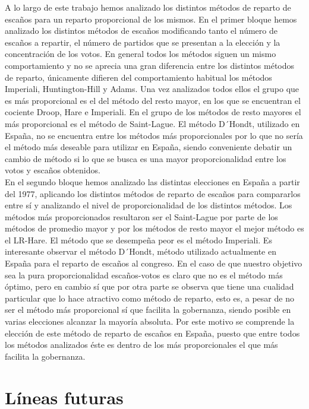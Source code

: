 \documentclass[12pt,a4paper,]{book}
\numberwithin{dummy}{section}
\theoremstyle{ocrenumbox}
\theoremstyle{blacknumex}
\theoremstyle{blacknumbox}
\theoremstyle{ocrenum}
\theoremstyle{ocrenum}
\begin{document}
A lo largo de este trabajo hemos analizado los distintos métodos de
reparto de escaños para un reparto proporcional de los mismos. En el
primer bloque hemos analizado los distintos métodos de escaños
modificando tanto el número de escaños a repartir, el número de partidos
que se presentan a la elección y la concentración de los votos. En
general todos los métodos siguen un mismo comportamiento y no se aprecia
una gran diferencia entre los distintos métodos de reparto, únicamente
difieren del comportamiento habitual los métodos Imperiali,
Huntington-Hill y Adams. Una vez analizados todos ellos el grupo que es
más proporcional es el del método del resto mayor, en los que se
encuentran el cociente Droop, Hare e Imperiali. En el grupo de los
métodos de resto mayores el más proporcional es el método de
Saint-Lague. El método D´Hondt, utilizado en España, no se encuentra
entre los métodos más proporcionales por lo que no sería el método más
deseable para utilizar en España, siendo conveniente debatir un cambio
de método si lo que se busca es una mayor proporcionalidad entre los
votos y escaños obtenidos.\\
En el segundo bloque hemos analizado las distintas elecciones en España
a partir del 1977, aplicando los distintos métodos de reparto de escaños
para compararlos entre sí y analizando el nivel de proporcionalidad de
los distintos métodos. Los métodos más proporcionados resultaron ser el
Saint-Lague por parte de los métodos de promedio mayor y por los métodos
de resto mayor el mejor método es el LR-Hare. El método que se desempeña
peor es el método Imperiali. Es interesante observar el método D´Hondt,
método utilizado actualmente en España para el reparto de escaños al
congreso. En el caso de que nuestro objetivo sea la pura
proporcionalidad escaños-votos es claro que no es el método más óptimo,
pero en cambio sí que por otra parte se observa que tiene una cualidad
particular que lo hace atractivo como método de reparto, esto es, a
pesar de no ser el método más proporcional sí que facilita la
gobernanza, siendo posible en varias elecciones alcanzar la mayoría
absoluta. Por este motivo se comprende la elección de este método de
reparto de escaños en España, puesto que entre todos los métodos
analizados éste es dentro de los más proporcionales el que más facilita
la gobernanza.

\hypertarget{luxedneas-futuras}{%
\section{Líneas futuras}\label{luxedneas-futuras}}
\end{document}
